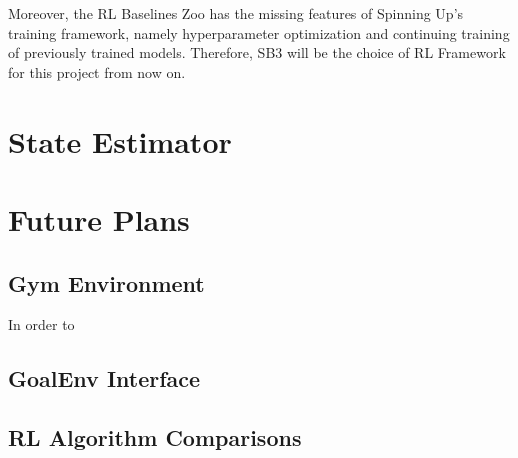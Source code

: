 Moreover, the RL Baselines Zoo has the missing features of Spinning Up's training framework, namely hyperparameter optimization and continuing training of previously trained models. Therefore, SB3 will be the choice of RL Framework for this project from now on.

\section{State Estimator}

\section{Future Plans}

\subsection{Gym Environment}

In order to

\subsection{GoalEnv Interface}

\subsection{RL Algorithm Comparisons}